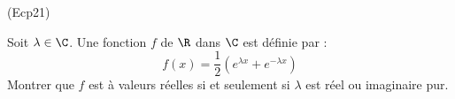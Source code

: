 \begin{tiny}(Ecp21)\end{tiny}
Soit $\lambda\in \C$. Une fonction $f$ de $\R$ dans $\C$ est définie par :
\begin{displaymath}
 f(x) = \frac{1}{2}(e^{\lambda x} + e^{-\lambda x})
\end{displaymath}
Montrer que $f$ est à valeurs réelles si et seulement si $\lambda$ est réel ou imaginaire pur.
